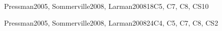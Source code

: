 \begin{syllabus}
\begin{unit}{\SESoftwareDesign}{}{Pressman2005, Sommerville2008, Larman2008}{18}{C5, C7, C8, CS10}
\begin{learningoutcomes}
			\item \SESoftwareDesignLOExplainHowMight [\Familiarity] %
			\item \SESoftwareDesignLODesignAA [\Usage] %
			\item \SESoftwareDesignLODiscussAnd [\Usage] %
			\item \SESoftwareDesignLOApplyModels [\Usage] %
			\item \SESoftwareDesignLOAnalyzeAFrom [\Assessment] %
			\item \SESoftwareDesignLOAnalyzeAFromOf [\Assessment] %
			\item \SESoftwareDesignLOExplainTheObjects [\Familiarity] %
			\item \SESoftwareDesignLOApplyComponent [\Usage] %
			\item \SESoftwareDesignLORefactorAn [\Usage] %
			\item \SESoftwareDesignLOStateAnd [\Familiarity] %
		\end{learningoutcomes}
	\end{unit}
	
	\begin{unit}{\SESoftwareConstruction}{}{Pressman2005, Sommerville2008, Larman2008}{24}{C4, C5, C7, C8, CS2}
		\begin{topics}
			\item \SESoftwareConstructionTopicCoding
			\item \SESoftwareConstructionTopicCodingStandards
			\item \SESoftwareConstructionTopicIntegration
			\item \SESoftwareConstructionTopicDevelopment
			\item \SESoftwareConstructionTopicPotential
		\end{topics}
	\begin{learningoutcomes}
			\item \SESoftwareConstructionLODescribeTechniques[\Assessment]
			\item \SESoftwareConstructionLOBuild[\Assessment]
			\item \SESoftwareConstructionLODescribeSecure[\Assessment]
			\item \SESoftwareConstructionLOSelectAndDefined[\Assessment]
			\item \SESoftwareConstructionLOCompareAndStrategies[\Assessment]
			\item \SESoftwareConstructionLODescribeTheAnalyzing[\Assessment]
			\item \SESoftwareConstructionLODescribeTheAnalyzingChanges[\Assessment]
			\item \SESoftwareConstructionLORewrite[\Assessment]
			\item \SESoftwareConstructionLOWriteAThatNon[\Assessment]
		\end{learningoutcomes}
	\end{unit}
	
	\begin{coursebibliography}
	\end{coursebibliography}
	
	\end{syllabus}
	
	